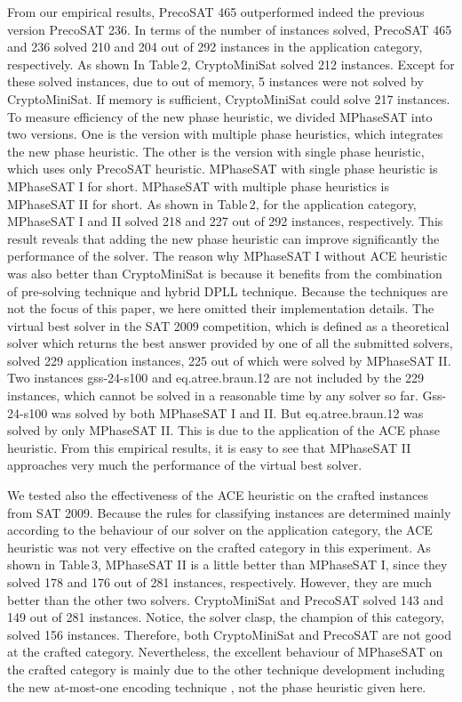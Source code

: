 \documentclass{llncs}
\begin{document}
From our empirical results, PrecoSAT 465 outperformed indeed the
previous version PrecoSAT 236. In terms of the number of instances
solved, PrecoSAT 465 and 236 solved 210 and 204 out of 292 instances
in the application category, respectively. As shown In Table\,2,
CryptoMiniSat solved 212 instances. Except for these solved
instances, due to out of memory, 5 instances were not solved by
CryptoMiniSat. If memory is sufficient, CryptoMiniSat could solve
217 instances. To measure efficiency of the new phase heuristic, we
divided MPhaseSAT into two versions. One is the version with
multiple phase heuristics, which integrates the new phase heuristic.
The other is the version with single phase heuristic, which uses
only PrecoSAT heuristic. MPhaseSAT with single phase heuristic is
MPhaseSAT I for short. MPhaseSAT with multiple phase heuristics is
MPhaseSAT II for short. As shown in Table\,2, for the application
category, MPhaseSAT I and II solved 218 and 227 out of 292
instances, respectively. This result reveals that adding the new
phase heuristic can improve significantly the performance of the
solver. The reason why MPhaseSAT I without ACE heuristic was also
better than CryptoMiniSat is because it benefits from the
combination of pre-solving technique and hybrid DPLL technique.
Because the techniques are not the focus of this paper, we here
omitted their implementation details. The virtual best solver in the
SAT 2009 competition, which is defined as a theoretical solver which
returns the best answer provided by one of all the submitted
solvers, solved 229 application instances, 225 out of which were
solved by MPhaseSAT II. Two instances gss-24-s100 and
eq.atree.braun.12 are not included by the 229 instances, which
cannot be solved in a reasonable time by any solver so far.
Gss-24-s100 was solved by both MPhaseSAT I and II. But
eq.atree.braun.12 was solved by only MPhaseSAT II. This is due to
the application of the ACE phase heuristic. From this empirical
results, it is easy to see that MPhaseSAT II approaches very much
the performance of the virtual best solver.

We tested also the effectiveness of the ACE heuristic on the crafted
instances from SAT 2009. Because the rules for classifying instances
are determined mainly according to the behaviour of our solver on
the application category, the ACE heuristic was not very effective
on the crafted category in this experiment. As shown in Table\,3,
MPhaseSAT II is a little better than MPhaseSAT I, since they solved
178 and 176 out of 281 instances, respectively. However, they are
much better than the other two solvers. CryptoMiniSat and PrecoSAT
solved 143 and 149 out of 281 instances. Notice, the solver clasp,
the champion of this category, solved 156 instances. Therefore, both
CryptoMiniSat and PrecoSAT are not good at the crafted category.
Nevertheless, the excellent behaviour of MPhaseSAT on the crafted
category is mainly due to the other technique development including
the new at-most-one encoding technique \cite {chenAMO:21}, not the
phase heuristic given here.
\end{document}
